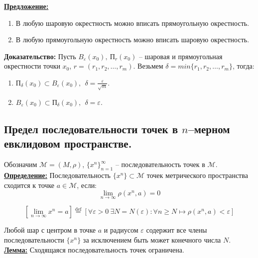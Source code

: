 \documentclass[a4paper,12pt]{article} %
\newcommand{\eqdef}{\stackrel{\mathrm{def}}{=}}
\begin{document}
	\underline{\textbf{Предложение:}}
	
	\begin{enumerate}
		\item В любую шаровую окрестность можно вписать прямоугольную окрестность.
		\item В любую прямоугольную окрестность можно вписать шаровую окрестность.
	\end{enumerate}
	
	\textbf{Доказательство:} Пусть $B_{\varepsilon}(x_0), ~ \text{П}_{r}(x_0)$ -- шаровая и прямоугольная окрестности точки $x_0$, $r = (r_1, r_2, \dots, r_m)$. Везьмем $\delta = min\{r_1, r_2, \dots, r_m \}$, тогда:
	
	\begin{enumerate}
		\item $\text{П}_{\delta}(x_0) \subset B_{\varepsilon}(x_0), ~~ \delta = \frac{\varepsilon}{\sqrt{m}}$.
		\item $B_{\varepsilon}(x_0) \subset \text{П}_{\delta}(x_0), ~~ \delta = \varepsilon$.\\
	\end{enumerate}
	
	\subsection{Предел последовательности точек в $n$–мерном евклидовом пространстве.}
	
	Обозначим $\mathscr{M} = (M, \rho)$, $\{x^n \}_{n = 1}^{\infty}$ -- последовательность точек в $\mathscr{M}$.\\
	
	\underline{\textbf{Определение:}} Последовательность $\{x^n \} \subset \mathscr{M}$ точек метрического пространства сходится к точке $a \in \mathscr{M}$, если:
	\begin{equation*}
		\lim\limits_{n \to \infty} \rho(x^n, a) = 0
	\end{equation*}
	
	\[ [\lim\limits_{n \to \infty} x^n = a] \eqdef [\forall \varepsilon > 0 ~ \exists N = N(\varepsilon) : \forall n \geqslant N \mapsto \rho(x^n, a) < \varepsilon] \]
	
	\noindent Любой шар с центром в точке $a$ и радиусом $\varepsilon$ содержит все члены последовательности $\{x^n \}$ за исключением быть может конечного числа $N$.\\
	
	\underline{\textbf{Лемма:}} Сходящаяся последовательность точек ограничена.\\
	
\end{document}
